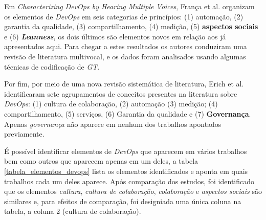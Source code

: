 Em \emph{Characterizing DevOps by Hearing Multiple Voices}, França et al.
\cite{characterizing_devops} organizam os elementos de \textit{DevOps} em seis
categorias de princípios: (1) automação, (2) garantia da qualidade,
(3) compartilhamento, (4) medição, (5) \textbf{aspectos sociais} e (6)
\textbf{\textit{Leanness}}, os dois últimos são elementos novos em relação
aos já apresentados aqui. Para chegar a estes resultados os autores conduziram
uma revisão de literatura multivocal, e os dados foram analisados usando
algumas técnicas de codificação de \textit{\acrfull{GT}}.

Por fim, por meio de uma nova revisão sistemática de literatura, Erich et al.
\cite{qualitative_devops_journalsw_17} identificaram sete agrupamentos de
conceitos presentes na literatura sobre \textit{DevOps}: (1) cultura de
colaboração, (2) automação (3) medição; (4) compartilhamento, (5) serviços,
(6) Garantia da qualidade e (7) \textbf{Governança}. Apenas \emph{governança}
não aparece em nenhum dos trabalhos apontados previamente.

É possível identificar elementos de \textit{DevOps} que aparecem em vários
trabalhos bem como outros que aparecem apenas em um deles, a tabela
\ref{tabela_elementos_devops} lista os elementos identificados e aponta em
quais trabalhos cada um deles aparece. Após comparação dos estudos, foi
identificado que os elementos \emph{cultura}, \emph{cultura de colaboração},
\emph{colaboração} e \emph{aspectos sociais} são similares e, para efeitos de
comparação, foi designiada uma única coluna na tabela, a coluna 2 (cultura de
colaboração).

